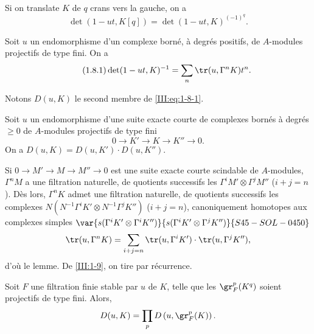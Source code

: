 \subsubsection{}\label{III:1-7-2}

Si on translate $K$ de $q$ crans vers la gauche, on a 
\[
  \det(1-u t,K[q]) = \det(1-u t,K)^{(-1)^q} \text{.}
\]





\begin{proposition_}\label{III:1-8}
Soit $u$ un endomorphisme d'un complexe borné, à degrés positifs, de 
$A$-modules projectifs de type fini. On a \
\begin{equation*}\tag{1.8.1}\label{III:eq:1-8-1}
  \det(1-u t,K)^{-1} = \sum_n \tr(u,\Gamma^n K) t^n \text{.}
\end{equation*}
\end{proposition_}

Notons $D(u,K)$ le second membre de \eqref{III:eq:1-8-1}. 





\begin{lemma_}\label{III:1-9}
Soit $u$ un endomorphisme d'une suite exacte courte de complexes bornés à 
degrés $\geqslant 0$ de $A$-modules projectifs de type fini 
\[
  0 \to K' \to K \to K'' \to 0 \text{.}
\]
On a $D(u,K)=D(u,K')\cdot D(u,K'')$.
\end{lemma_}

Si $0\to M'\to M\to M''\to 0$ est une suite exacte courte scindable de 
$A$-modules, $\Gamma^n M$ a une filtration naturelle, de quotients successifs 
les $\Gamma^i M'\otimes \Gamma^j M''$ ($i+j=n$). Dès lors, $\Gamma^n K$ admet 
une filtration naturelle, de quotients successifs les complexes 
$N(N^{-1} \Gamma^i K'\otimes N^{-1}\Gamma^j K'')$ ($i+j=n$), canoniquement 
homotopes aux complexes simples $\var{s(\Gamma^i K'\otimes \Gamma^i K'')}{s(\Gamma^i K'\otimes \Gamma^j K'')}{S45-SOL-0450}$   
\[
  \tr(u,\Gamma^n K) = \sum_{i+j=n} \tr(u,\Gamma^i K')\cdot \tr(u,\Gamma^j K'') \text{,}
\]
d'où le lemme. De \ref{III:1-9}, on tire par récurrence. 





\begin{lemma_}\label{III:1-10}
Soit $F$ une filtration finie stable par $u$ de $K$, telle que les 
$\gr_F^p(K^q)$ soient projectifs de type fini. Alors, 
\[
  D(u,K) = \prod_p D\left(u,\gr_F^p(K)\right) \text{.}
\]
\end{lemma_}





